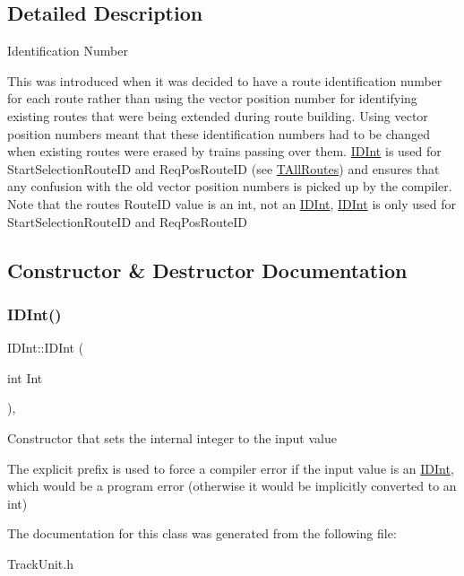 \subsection{Detailed Description}
Identification Number

This was introduced when it was decided to have a route identification number for each route rather than using the vector position number for identifying existing routes that were being extended during route building. Using vector position numbers meant that these identification numbers had to be changed when existing routes were erased by trains passing over them. \mbox{\hyperlink{class_i_d_int}{I\+D\+Int}} is used for Start\+Selection\+Route\+ID and Req\+Pos\+Route\+ID (see \mbox{\hyperlink{class_t_all_routes}{T\+All\+Routes}}) and ensures that any confusion with the old vector position numbers is picked up by the compiler. Note that the route\textquotesingle{}s Route\+ID value is an \textquotesingle{}int\textquotesingle{}, not an \textquotesingle{}\mbox{\hyperlink{class_i_d_int}{I\+D\+Int}}\textquotesingle{}, \textquotesingle{}\mbox{\hyperlink{class_i_d_int}{I\+D\+Int}}\textquotesingle{} is only used for Start\+Selection\+Route\+ID and Req\+Pos\+Route\+ID 

\subsection{Constructor \& Destructor Documentation}
\mbox{\label{class_i_d_int_ae51fdc864457738e484bb91c829b082c}} 
\subsubsection{\texorpdfstring{I\+D\+Int()}{IDInt()}}
{\footnotesize\ttfamily I\+D\+Int\+::\+I\+D\+Int (\begin{DoxyParamCaption}\item[{int}]{Int }\end{DoxyParamCaption})\hspace{0.3cm}{\ttfamily [inline]}, {\ttfamily [explicit]}}

Constructor that sets the internal integer to the input value

The \textquotesingle{}explicit\textquotesingle{} prefix is used to force a compiler error if the input value is an \mbox{\hyperlink{class_i_d_int}{I\+D\+Int}}, which would be a program error (otherwise it would be implicitly converted to an int) 

The documentation for this class was generated from the following file\+:\begin{DoxyCompactItemize}
\item 
Track\+Unit.\+h\end{DoxyCompactItemize}
